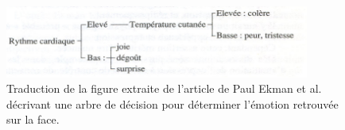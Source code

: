 \begin{figure}
  \centering
  \includegraphics[width=10cm]{./Chapitre1/figures/Ekman1983.png}
  \caption{Traduction de la figure extraite de l'article de Paul Ekman et al.~\cite{Ekman1983} décrivant une arbre de décision pour déterminer l'émotion retrouvée sur la face.}
  \label{fig:Ekman1983}
\end{figure}
